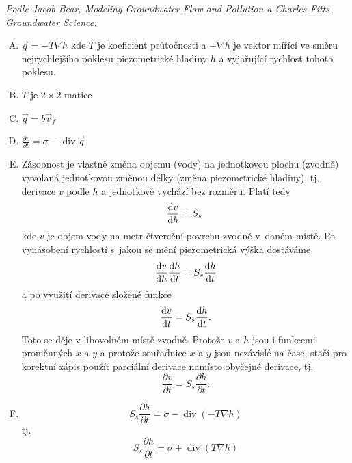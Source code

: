 \textit{Podle Jacob Bear, Modeling Groundwater Flow and Pollution a Charles Fitts, Groundwater Science.}

\reseni

\begin{enumerate}[A)]
\item $\vec q=-T \nabla h$ kde $T$ je koeficient průtočnosti a $-\nabla h$
  je vektor mířící ve směru nejrychlejšího poklesu piezometrické
  hladiny $h$ a vyjařující rychlost tohoto poklesu.
\item $T$ je  $2\times 2$ matice
\item $\vec q=b\vec v_f$
\item $\frac{\partial v}{\partial t}=\sigma-\mathop{\mathrm{div}}\vec q$
\item Zásobnost je vlastně změna objemu (vody) na jednotkovou plochu
  (zvodně) vyvolaná  jednotkovou změnou délky (změna piezometrické hladiny),
  tj. derivace $v$ podle $h$ a jednotkově vychází bez rozměru. Platí tedy
  \begin{equation*}
    \derivace vh=S_s \end{equation*}
  kde $v$ je objem vody na
  metr čtvereční povrchu zvodně v daném místě. Po vynásobení rychlostí s jakou se
  mění piezometrická výška dostáváme
  \begin{equation*}
    \frac{\mathrm{d}v}{\mathrm{d}h} \frac{\mathrm{d}h}{\mathrm{d}t}=S_s\frac{\mathrm{d}h}{\mathrm{d}t}
  \end{equation*}
   a po využití derivace složené funkce
  \begin{equation*}
    \frac{\mathrm{d}v}{\mathrm{d}t}=S_s\frac{\mathrm{d}h}{\mathrm{d}t}.
  \end{equation*}
  Toto se děje v libovolném místě zvodně. Protože $v$ a $h$ jsou i funkcemi proměnných $x$ a $y$ a protože souřadnice $x$ a $y$ jsou nezávislé na čase, stačí pro korektní zápis použít parciální derivace namísto obyčejné derivace, tj.
  \begin{equation*}
       \frac{\partial v}{\partial t} = S_s \frac {\partial h}{\partial t}.
     \end{equation*}
\item
  \begin{equation*}
    S_s\frac{\partial h}{\partial t}=\sigma - \mathop{\mathrm{div}} \left(-T\nabla h\right)
  \end{equation*}
  tj. 
  \begin{equation*}
    S_s\frac{\partial h}{\partial t}=\sigma + \mathop{\mathrm{div}} \left(T\nabla h\right)
  \end{equation*}

\end{enumerate}
\konec
\stranka

